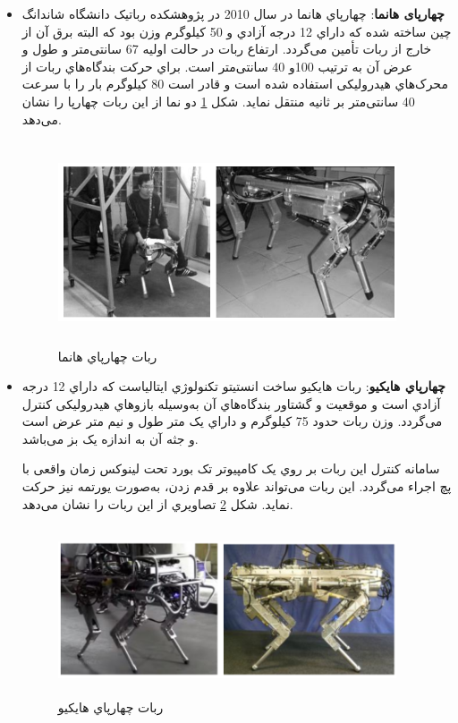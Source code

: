 \begin{itemize}
\item
\textbf{چهارپای هانما}:
چهارپاي هانما
\unskip{}
در سال 2010 در پژوهشكده رباتیک دانشگاه شاندانگ
\unskip{}
چین ساخته شده که داراي 12 درجه آزادي و 50 کیلوگرم وزن بود که البته برق آن از خارج از ربات تأمین می‌گردد\cite{Hanma}. ارتفاع ربات در حالت اولیه 67 سانتی‌متر و طول و عرض آن به ترتیب  100و 40 سانتی‌متر است. براي حرکت بندگاه‌هاي ربات از محرک‌هاي هیدرولیكی استفاده شده است و قادر است 80 کیلوگرم بار را با سرعت  40 سانتی‌متر بر ثانیه منتقل نماید. شكل
\ref{ربات هانما}
دو نما از این ربات چهارپا را نشان می‌دهد.
    \begin{figure}[!h]
	\centering
	\includegraphics[height=6cm,width=10cm]{./Images/CH1/Hanma_robot.png}
	\caption[ربات چهارپاي هانما]{ربات چهارپاي هانما\cite{Hanma}}
	\label{ربات هانما}
	\end{figure}

\newpage	
\item
\textbf{چهارپاي هایكیو}:
ربات‌ هایكیو
\unskip{}
ساخت انستیتو تكنولوژي ایتالیاست که داراي 12 درجه آزادي است و موقعیت و گشتاور بندگاه‌هاي آن به‌وسیله بازوهاي هیدرولیكی کنترل می‌گردد\cite{HyQ}. وزن ربات حدود 75 کیلوگرم و داراي یک متر طول و نیم متر عرض است و جثه آن به اندازه یک بز می‌باشد.

سامانه کنترل این ربات بر روي یک کامپیوتر تک بورد
تحت لینوکس زمان واقعی با پچ
 اجراء می‌گردد. این ربات می‌تواند علاوه بر قدم زدن، به‌صورت یورتمه نیز حرکت نماید. شكل
 \ref{ربات هایکیو}
 تصاویري از این ربات را نشان می‌دهد.
    \begin{figure}[!h]
	\centering
	\includegraphics[height=5cm,width=10cm]{./Images/CH1/HyQ_robot.png}
	\caption[ربات چهارپاي هایكیو]{ربات چهارپاي هایكیو\cite{HyQ}}
	\label{ربات هایکیو}
	\end{figure}
	
\end{itemize}

